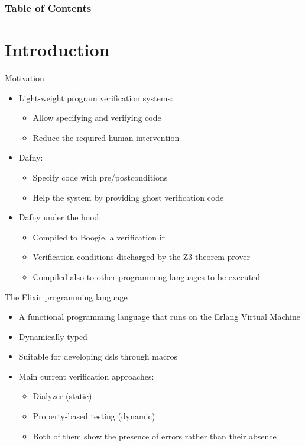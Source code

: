\documentclass{beamer}
\title{\titulo}
\subtitle{Master's Degree in Formal Methods and Computer Engineering}
\date{\today}
\author{\autor \\ Supervisor: Manuel Montenegro Montes}
\institute{Complutense University of Madrid}
\begin{document}
  \maketitle
  \begin{frame}
    \frametitle{Table of Contents}
    \tableofcontents
  \end{frame}
  \section{Introduction}
  \begin{frame}{Motivation}
    \begin{itemize}
      \item \pause Light-weight program verification systems:
      \begin{itemize}
        \item \pause Allow specifying and verifying code
        \item \pause Reduce the required human intervention
      \end{itemize}
      \item \pause Dafny:
      \begin{itemize}
        \item \pause Specify code with pre/postconditions
        \item \pause Help the system by providing ghost verification code
      \end{itemize}
      \item \pause Dafny under the hood:
      \begin{itemize}
        \item \pause Compiled to Boogie, a verification \gls*{ir}
        \item \pause Verification conditions discharged by the Z3 theorem prover
        \item \pause Compiled also to other programming languages to be executed
      \end{itemize}
    \end{itemize}
  \end{frame}
  \begin{frame}{The Elixir programming language}
    \begin{itemize}
      \item \pause A functional programming language that runs on the Erlang Virtual Machine
      \item \pause Dynamically typed
      \item \pause Suitable for developing \gls*{dsl}s through macros
      \item \pause Main current verification approaches:
      \begin{itemize}
        \item \pause Dialyzer (static)
        \item \pause Property-based testing (dynamic)
        \item \pause Both of them show the presence of errors rather than their absence
      \end{itemize}
    \end{itemize}
  \end{frame}
\end{document}
